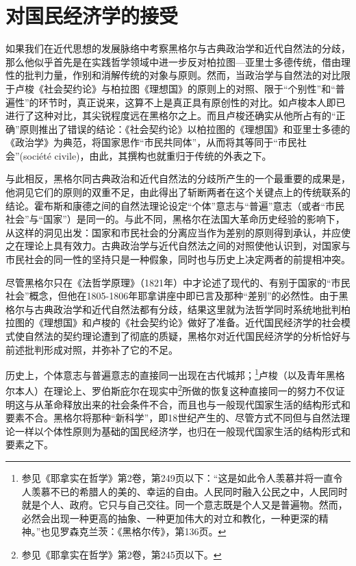 \chapter{对国民经济学的接受}

如果我们在近代思想的发展脉络中考察黑格尔与古典政治学和近代自然法的分歧，那么他似乎首先是在实践哲学领域中进一步反对柏拉图—亚里士多德传统，借由理性的批判力量，作别和消解传统的对象与原则。然而，当政治学与自然法的对比限于卢梭《社会契约论》与柏拉图《理想国》的原则上的对照、限于“个别性”和“普遍性”的环节时，真正说来，这算不上是真正具有原创性的对比。如卢梭本人即已进行了这种对比，其尖锐程度远在黑格尔之上。而且卢梭还确实从他所占有的“正确”原则推出了错误的结论：《社会契约论》以柏拉图的《理想国》和亚里士多德的《政治学》为典范，将国家思作“市民共同体”，从而将其等同于“市民社会”(société civile)，由此，其撰构也就重归于传统的外表之下。

与此相反，黑格尔同古典政治和近代自然法的分歧所产生的一个最重要的成果是，他洞见它们的原则的双重不足，由此得出了斩断两者在这个关键点上的传统联系的结论。霍布斯和康德之间的自然法理论设定“个体”意志与“普遍”意志（或者“市民社会”与“国家”）是同一的。与此不同，黑格尔在法国大革命历史经验的影响下，从这样的洞见出发：国家和市民社会的分离应当作为差别的原则得到承认，并应使之在理论上具有效力。古典政治学与近代自然法之间的对照使他认识到，对国家与市民社会的同一性的坚持只是一种假象，同时也与历史上决定两者的前提相冲突。

尽管黑格尔只在《法哲学原理》（1821年）中才论述了现代的、有别于国家的“市民社会”概念，但他在1805-1806年耶拿讲座中即已言及那种“差别”的必然性。由于黑格尔与古典政治学和近代自然法都有分歧，结果这里就为法哲学同时系统地批判柏拉图的《理想国》和卢梭的《社会契约论》做好了准备。近代国民经济学的社会模式使自然法的契约理论遭到了彻底的质疑，黑格尔对近代国民经济学的分析恰好与前述批判形成对照，并弥补了它的不足。

历史上，个体意志与普遍意志的直接同一出现在古代城邦；\footnote{参见《耶拿实在哲学》第2卷，第249页以下：“这是如此令人羡慕并将一直令人羡慕不已的希腊人的美的、幸运的自由。人民同时融入公民之中，人民同时就是个人、政府。它只与自己交往。同一个意志既是个人又是普遍物。然而，必然会出现一种更高的抽象、一种更加伟大的对立和教化，一种更深的精神。”也见罗森克兰茨：《黑格尔传》，第136页。}卢梭（以及青年黑格尔本人）在理论上、罗伯斯庇尔在现实中\footnote{参见《耶拿实在哲学》第2卷，第245页以下。}所做的恢复这种直接同一的努力不仅证明这与从革命释放出来的社会条件不合，而且也与一般现代国家生活的结构形式和要素不合。黑格尔将那种“新科学”，即18世纪产生的、尽管方式不同但与自然法理论一样以个体性原则为基础的国民经济学，也归在一般现代国家生活的结构形式和要素之下。

